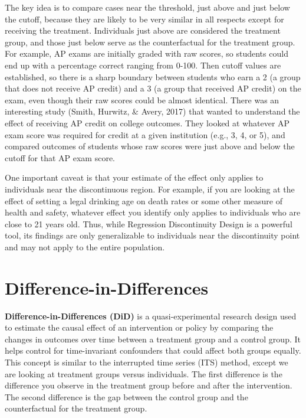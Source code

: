 \documentclass[
  letterpaper,
  DIV=11,
  numbers=noendperiod]{scrreprt}
\begin{document}
The key idea is to compare cases near the threshold, just above and just
below the cutoff, because they are likely to be very similar in all
respects except for receiving the treatment. Individuals just above are
considered the treatment group, and those just below serve as the
counterfactual for the treatment group. For example, AP exams are
initially graded with raw scores, so students could end up with a
percentage correct ranging from 0-100. Then cutoff values are
established, so there is a sharp boundary between students who earn a 2
(a group that does not receive AP credit) and a 3 (a group that received
AP credit) on the exam, even though their raw scores could be almost
identical. There was an interesting study (Smith, Hurwitz, \& Avery,
2017) that wanted to understand the effect of receiving AP credit on
college outcomes. They looked at whatever AP exam score was required for
credit at a given institution (e.g., 3, 4, or 5), and compared outcomes
of students whose raw scores were just above and below the cutoff for
that AP exam score.

One important caveat is that your estimate of the effect only applies to
individuals near the discontinuous region. For example, if you are
looking at the effect of setting a legal drinking age on death rates or
some other measure of health and safety, whatever effect you identify
only applies to individuals who are close to 21 years old. Thus, while
Regression Discontinuity Design is a powerful tool, its findings are
only generalizable to individuals near the discontinuity point and may
not apply to the entire population.

\section{Difference-in-Differences}\label{difference-in-differences}

\textbf{Difference-in-Differences (DiD)} is a quasi-experimental
research design used to estimate the causal effect of an intervention or
policy by comparing the changes in outcomes over time between a
treatment group and a control group. It helps control for time-invariant
confounders that could affect both groups equally. This concept is
similar to the interrupted time series (ITS) method, except we are
looking at treatment groups versus individuals. The first difference is
the difference you observe in the treatment group before and after the
intervention. The second difference is the gap between the control group
and the counterfactual for the treatment group.
\end{document}
